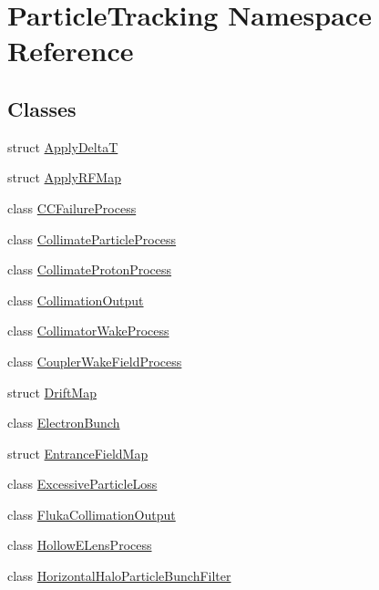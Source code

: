 \hypertarget{namespaceParticleTracking}{}\section{Particle\+Tracking Namespace Reference}
\label{namespaceParticleTracking}
\subsection*{Classes}
\begin{DoxyCompactItemize}
\item 
struct \hyperlink{structParticleTracking_1_1ApplyDeltaT}{Apply\+DeltaT}
\item 
struct \hyperlink{structParticleTracking_1_1ApplyRFMap}{Apply\+R\+F\+Map}
\item 
class \hyperlink{classParticleTracking_1_1CCFailureProcess}{C\+C\+Failure\+Process}
\item 
class \hyperlink{classParticleTracking_1_1CollimateParticleProcess}{Collimate\+Particle\+Process}
\item 
class \hyperlink{classParticleTracking_1_1CollimateProtonProcess}{Collimate\+Proton\+Process}
\item 
class \hyperlink{classParticleTracking_1_1CollimationOutput}{Collimation\+Output}
\item 
class \hyperlink{classParticleTracking_1_1CollimatorWakeProcess}{Collimator\+Wake\+Process}
\item 
class \hyperlink{classParticleTracking_1_1CouplerWakeFieldProcess}{Coupler\+Wake\+Field\+Process}
\item 
struct \hyperlink{structParticleTracking_1_1DriftMap}{Drift\+Map}
\item 
class \hyperlink{classParticleTracking_1_1ElectronBunch}{Electron\+Bunch}
\item 
struct \hyperlink{structParticleTracking_1_1EntranceFieldMap}{Entrance\+Field\+Map}
\item 
class \hyperlink{classParticleTracking_1_1ExcessiveParticleLoss}{Excessive\+Particle\+Loss}
\item 
class \hyperlink{classParticleTracking_1_1FlukaCollimationOutput}{Fluka\+Collimation\+Output}
\item 
class \hyperlink{classParticleTracking_1_1HollowELensProcess}{Hollow\+E\+Lens\+Process}
\item 
class \hyperlink{classParticleTracking_1_1HorizontalHaloParticleBunchFilter}{Horizontal\+Halo\+Particle\+Bunch\+Filter}
\item 

\end{DoxyCompactItemize}
